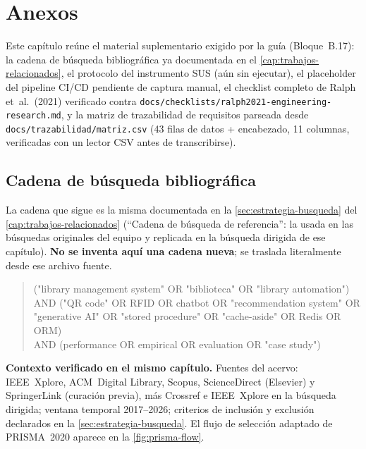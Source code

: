 \chapter{Anexos}

Este capítulo reúne el material suplementario exigido por la guía
(Bloque~B.17): la cadena de búsqueda bibliográfica ya documentada en el
\autoref{cap:trabajos-relacionados}, el protocolo del instrumento SUS
(aún sin ejecutar), el placeholder del pipeline CI/CD pendiente de
captura manual, el checklist completo de Ralph et~al.\ (2021) verificado
contra \texttt{docs/checklists/ralph2021-engineering-research.md}, y la
matriz de trazabilidad de requisitos parseada desde
\texttt{docs/trazabilidad/matriz.csv} (43 filas de datos + encabezado,
11 columnas, verificadas con un lector CSV antes de transcribirse).

\section{Cadena de búsqueda bibliográfica}

La cadena que sigue es la misma documentada en la
\autoref{sec:estrategia-busqueda} del \autoref{cap:trabajos-relacionados}
(``Cadena de búsqueda de referencia'': la usada en las búsquedas
originales del equipo y replicada en la búsqueda dirigida de ese
capítulo). \textbf{No se inventa aquí una cadena nueva}; se traslada
literalmente desde ese archivo fuente.

\begin{quote}
\ttfamily
("library management system" OR "biblioteca" OR "library automation")\\
AND ("QR code" OR RFID OR chatbot OR "recommendation system" OR\\
\phantom{AND (}"generative AI" OR "stored procedure" OR "cache-aside" OR Redis OR ORM)\\
AND (performance OR empirical OR evaluation OR "case study")
\end{quote}

\textbf{Contexto verificado en el mismo capítulo.} Fuentes del acervo:
IEEE~Xplore, ACM~Digital Library, Scopus, ScienceDirect (Elsevier) y
SpringerLink (curación previa), más Crossref e IEEE~Xplore en la
búsqueda dirigida; ventana temporal 2017--2026; criterios de inclusión y
exclusión declarados en la \autoref{sec:estrategia-busqueda}. El flujo de
selección adaptado de PRISMA~2020 aparece en la
\autoref{fig:prisma-flow}.

